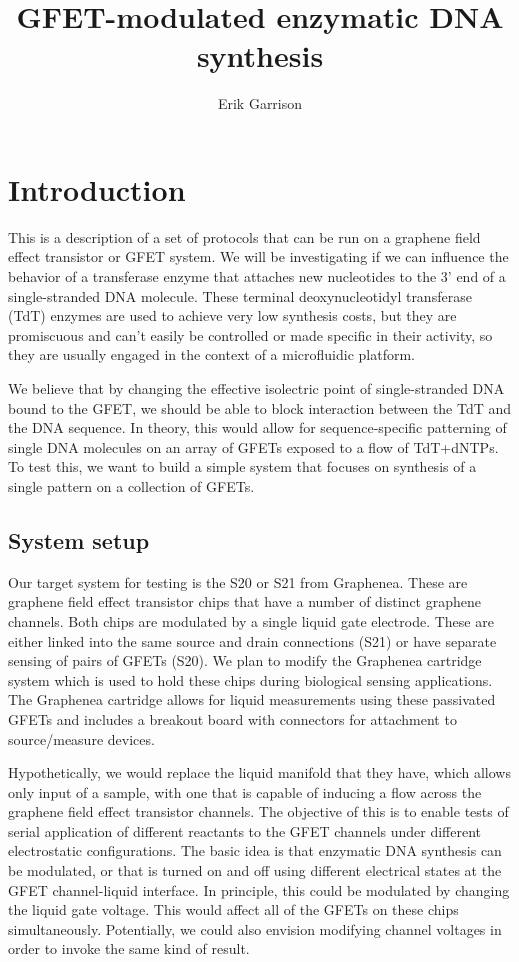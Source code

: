 \documentclass[11pt]{article}
\begin{document}
\title{GFET-modulated enzymatic DNA synthesis}

\author{Erik Garrison}
\maketitle


\section*{Introduction}

This is a description of a set of protocols that can be run on a graphene field effect transistor or GFET system.
We will be investigating if we can influence the behavior of a transferase enzyme that attaches new nucleotides to the 3' end of a single-stranded DNA molecule.
These terminal deoxynucleotidyl transferase (TdT) enzymes are used to achieve very low synthesis costs, but they are promiscuous and can't easily be controlled or made specific in their activity, so they are usually engaged in the context of a microfluidic platform.

We believe that by changing the effective isolectric point of single-stranded DNA bound to the GFET, we should be able to block interaction between the TdT and the DNA sequence.
In theory, this would allow for sequence-specific patterning of single DNA molecules on an array of GFETs exposed to a flow of TdT+dNTPs.
To test this, we want to build a simple system that focuses on synthesis of a single pattern on a collection of GFETs.

\subsection*{System setup}

Our target system for testing is the S20 or S21 from Graphenea.
These are graphene field effect transistor chips that have a number of distinct graphene channels.
Both chips are modulated by a single liquid gate electrode.
These are either linked into the same source and drain connections (S21) or have separate sensing of pairs of GFETs (S20).
We plan to modify the Graphenea cartridge system which is used to hold these chips during biological sensing applications.
The Graphenea cartridge allows for liquid measurements using these passivated GFETs and includes a breakout board with connectors for attachment to source/measure devices.

Hypothetically, we would replace the liquid manifold that they have, which allows only input of a sample, with one that is capable of inducing a flow across the graphene field effect transistor channels.
The objective of this is to enable tests of serial application of different reactants to the GFET channels under different electrostatic configurations.
The basic idea is that enzymatic DNA synthesis can be modulated, or that is turned on and off using different electrical states at the GFET channel-liquid interface.
In principle, this could be modulated by changing the liquid gate voltage.
This would affect all of the GFETs on these chips simultaneously.
Potentially, we could also envision modifying channel voltages in order to invoke the same kind of result.
\end{document}
